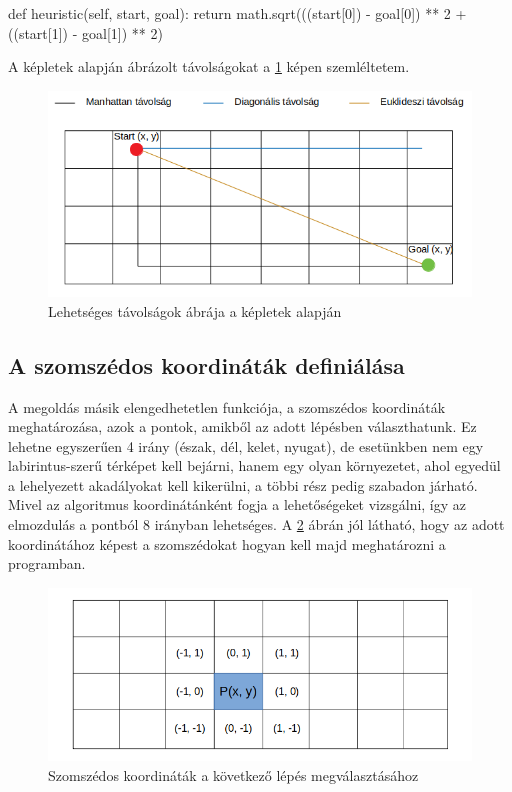 \begin{python}
    def heuristic(self, start, goal):
        return math.sqrt(((start[0]) - goal[0]) ** 2 +
                         ((start[1]) - goal[1]) ** 2)
\end{python}

A képletek alapján ábrázolt távolságokat a  \ref{fig:distances} képen szemléltetem.

\begin{figure}[h!]
\centering
\includegraphics[scale=0.65]{images/distances.png}
\caption{Lehetséges távolságok ábrája a képletek alapján}
\label{fig:distances}
\end{figure}

\subsection{A szomszédos koordináták definiálása}

A megoldás másik elengedhetetlen funkciója, a szomszédos koordináták meghatározása, azok a pontok, amikből az adott lépésben választhatunk. Ez lehetne egyszerűen 4 irány (észak, dél, kelet, nyugat), de esetünkben nem egy labirintus-szerű térképet kell bejárni, hanem egy olyan környezetet, ahol egyedül a lehelyezett akadályokat kell kikerülni, a többi rész pedig szabadon járható. Mivel az algoritmus koordinátánként fogja a lehetőségeket vizsgálni, így az elmozdulás a pontból 8 irányban lehetséges. A \ref{fig:neighbours} ábrán jól látható, hogy az adott koordinátához képest a szomszédokat hogyan kell majd meghatározni a programban.

\begin{figure}[h!]
\centering
\includegraphics[scale=0.60]{images/neighbours.png}
\caption{Szomszédos koordináták a következő lépés megválasztásához}
\label{fig:neighbours}
\end{figure}

